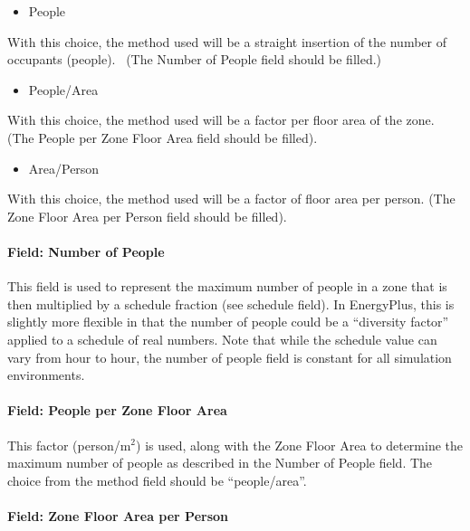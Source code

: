 \begin{itemize}
\tightlist
\item
  People
\end{itemize}

With this choice, the method used will be a straight insertion of the number of occupants (people).~ (The Number of People field should be filled.)

\begin{itemize}
\tightlist
\item
  People/Area
\end{itemize}

With this choice, the method used will be a factor per floor area of the zone. (The People per Zone Floor Area field should be filled).

\begin{itemize}
\tightlist
\item
  Area/Person
\end{itemize}

With this choice, the method used will be a factor of floor area per person. (The Zone Floor Area per Person field should be filled).

\paragraph{Field: Number of People}\label{field-number-of-people}

This field is used to represent the maximum number of people in a zone that is then multiplied by a schedule fraction (see schedule field). In EnergyPlus, this is slightly more flexible in that the number of people could be a ``diversity factor'' applied to a schedule of real numbers. Note that while the schedule value can vary from hour to hour, the number of people field is constant for all simulation environments.

\paragraph{Field: People per Zone Floor Area}\label{field-people-per-zone-floor-area}

This factor (person/m\(^{2}\)) is used, along with the Zone Floor Area to determine the maximum number of people as described in the Number of People field. The choice from the method field should be ``people/area''.

\paragraph{Field: Zone Floor Area per Person}\label{field-zone-floor-area-per-person}

